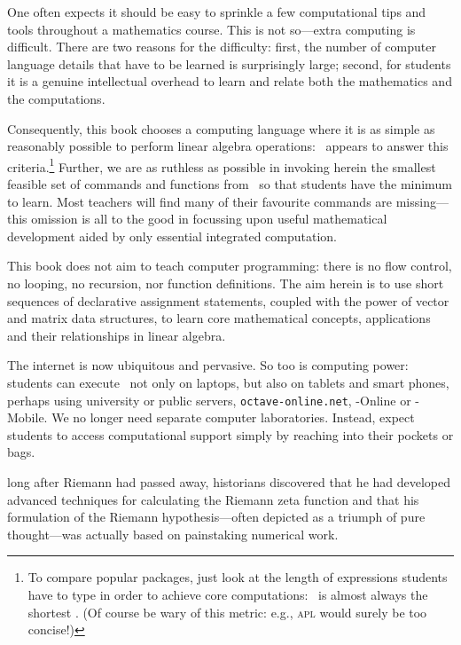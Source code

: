 One often expects it should be easy to sprinkle a few computational tips and tools throughout a mathematics course.
This is not so---extra computing is difficult.
There are two reasons for the difficulty: 
first, the number of computer language details that have to be learned is surprisingly large;
second, for students it is a genuine intellectual overhead to learn and relate both the mathematics and the computations.

Consequently, this book chooses a computing language where it is as simple as reasonably possible to perform linear algebra operations: \script\ appears to answer this criteria.\footnote{To compare popular packages, just look at the length of expressions students have to type in order to achieve core computations: \script\ is almost always the shortest \cite[e.g.]{Nakos1998}.  
(Of course be wary of this metric: e.g., \textsc{apl} would surely be too concise!)}
Further, we are as ruthless as possible in invoking herein the smallest feasible set of commands and functions from \script\ so that  students have the minimum to learn.
Most teachers will find many of their favourite commands are missing---this omission is all to the good in focussing upon useful mathematical development aided by only essential integrated computation.

This book does not aim to teach computer programming: there is no flow control, no looping, no recursion, nor function definitions.
The aim herein is to use short sequences of declarative assignment statements, coupled with the power of vector and matrix data structures, to learn core mathematical concepts, applications and their relationships in linear algebra. 

The internet is now ubiquitous and pervasive. 
So too is computing power: students can execute \script\ not only on laptops, but also on tablets and smart phones, perhaps using university or public servers, \verb|octave-online.net|, \script[1]-Online or \script[1]-Mobile. 
We no longer need separate computer laboratories.
Instead, expect students to access computational support simply by reaching into their pockets or bags.

\begin{quoted}{\cite{Donoho2015}}
long after Riemann had passed away, historians discovered that he had developed advanced techniques for calculating the Riemann zeta function and that his formulation of the Riemann hypothesis---often depicted as a triumph of pure thought---was actually based on painstaking numerical work.
\end{quoted}







